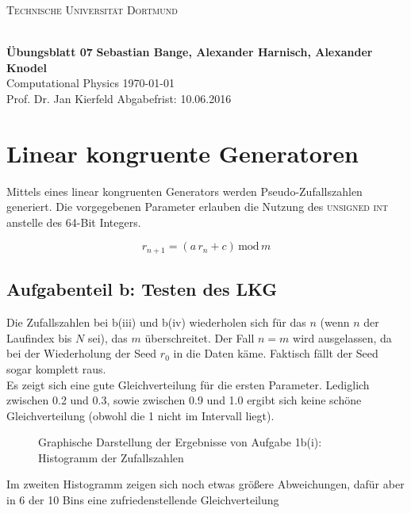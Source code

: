 
\usepackage{verbatim}
\newcommand\OverfullCenter[1]{\noindent\makebox[\linewidth]{#1}}

\noindent
\centerline{\small{\textsc{Technische Universität Dortmund}}} \\
\large\textbf{Übungsblatt 07} \hfill \footnotesize\textbf{Sebastian Bange, Alexander Harnisch, Alexander Knodel} \\
\normalsize Computational Physics \hfill \today \\
Prof. Dr. Jan Kierfeld \hfill Abgabefrist: 10.06.2016\\
\noindent\makebox[\linewidth]{\rule{\textwidth}{0.4pt}}
\section*{Linear kongruente Generatoren}
Mittels eines linear kongruenten Generators werden Pseudo-Zufallszahlen generiert. Die vorgegebenen Parameter erlauben die Nutzung des \textsc{unsigned int} anstelle des 64-Bit Integers.

\begin{equation}
r_{n+1} = (a\,r_n+c)\,\text{mod}\,m
\label{linConGen}
\end{equation}

\subsection*{Aufgabenteil b: Testen des LKG}
Die Zufallszahlen bei b(iii) und b(iv) wiederholen sich für das $n$ (wenn $n$ der Laufindex bis $N$ sei), das $m$ überschreitet. Der Fall $n=m$ wird ausgelassen, da bei der Wiederholung der Seed $r_0$ in die Daten käme. Faktisch fällt der Seed sogar komplett raus.\\
Es zeigt sich eine gute Gleichverteilung für die ersten Parameter. Lediglich zwischen 0.2 und 0.3, sowie zwischen 0.9 und 1.0 ergibt sich keine schöne Gleichverteilung (obwohl die 1 nicht im Intervall liegt). 

\begin{landscape}
	\begin{figure}
		\OverfullCenter{\texttt{[image: ../Abgabe/1b1\_hist.pdf]}}
		\caption{Graphische Darstellung der Ergebnisse von Aufgabe 1b(i): Histogramm der Zufallszahlen}
		\label{fig:1b1}
	\end{figure}
\end{landscape}

Im zweiten Histogramm zeigen sich noch etwas größere Abweichungen, dafür aber in 6 der 10 Bins eine zufriedenstellende Gleichverteilung

